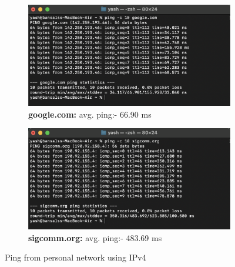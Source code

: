 \documentclass{article}
\begin{document}
\begin{figure}[H]
    \centering
    \begin{subfigure}[b]{0.48\textwidth}
        \centering
        \includegraphics[width=\textwidth]{ping_google_personal_ipv4.png}
        \caption*{\textbf{google.com:} avg. ping:- 66.90 ms}
    \end{subfigure}
    \hfill
    \begin{subfigure}[b]{0.48\textwidth}
        \centering
        \includegraphics[width=\textwidth]{ping_sigcomm_personal_ipv4.png}
        \caption*{\textbf{sigcomm.org:} avg. ping:- 483.69 ms}
    \end{subfigure}
    \caption*{Ping from personal network using IPv4}
\end{figure}
\end{document}
